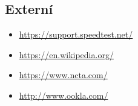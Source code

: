 \documentclass[12pt,a4paper]{article}
\begin{document}
\subsection{Externí}

\begin{itemize}
\item \href{https://support.speedtest.net/hc/en-us/articles/203845400-How-does-the-test-itself-work-How-is-the-result-calculated-}
	   {https://support.speedtest.net/}
\item \href{https://en.wikipedia.org/wiki/Speedtest.net}
	   {https://en.wikipedia.org/}
\item \href{https://www.ncta.com/platform/broadband-internet/how-do-internet-speed-tests-work-2/}
	   {https://www.ncta.com/}
\item \href{http://www.ookla.com/docs/UnderstandingBroadbandMeasurement.pdf}
	   {http://www.ookla.com/}
\end{itemize}





%
%

%
%

\end{document}
